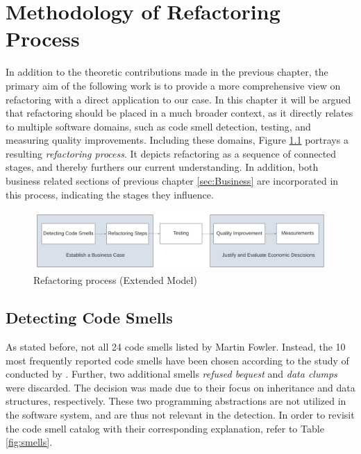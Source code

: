\chapter{Methodology of Refactoring Process}
\label{chapter:methodology}
In addition to the theoretic contributions made in the previous chapter, the primary aim of the following work is to provide a more comprehensive view on refactoring with a direct application to our case. In this chapter it will be argued that refactoring should be placed in a much broader context, as it directly relates to multiple software domains, such as code smell detection, testing, and measuring quality improvements. Including these domains, Figure \ref{fig:extended-model} portrays a resulting \emph{refactoring process}. It depicts refactoring as a sequence of connected stages, and thereby furthers our current understanding. In addition, both business related sections of previous chapter \ref{sec:Business} are incorporated in this process, indicating the stages they influence.

\bigskip %
\begin{figure}[htp]
    \centering
    \includegraphics[width=\textwidth]{./assets/extended_refactoring}
    \caption{Refactoring process (Extended Model)}
    \label{fig:extended-model}
\end{figure}
\bigskip %

\section{Detecting Code Smells}

As stated before, not all 24 code smells listed by Martin Fowler. Instead, the 10 most frequently reported code smells have been chosen according to the study of conducted by \textcite{lacerda2020}.
Further, two additional smells \emph{refused bequest} and \emph{data clumps} were discarded. The decision was made due to their focus on inheritance and data structures, respectively. These two programming abstractions are not utilized in the software system, and are thus not relevant in the detection. In order to revisit the code smell catalog with their corresponding explanation, refer to Table \ref{fig:smells}. 



